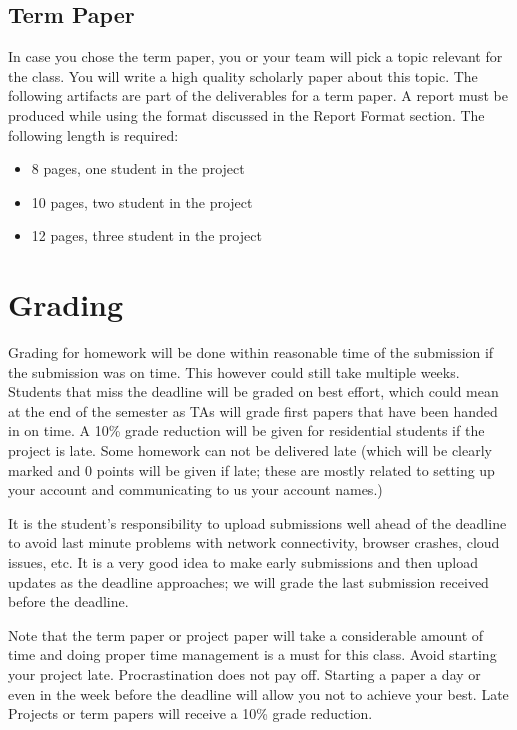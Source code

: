\subsection{Term Paper}

In case you chose the term paper, you or your team will pick a topic
relevant for the class. You will write a high quality scholarly paper
about this topic. The following artifacts are part of the deliverables
for a term paper. A report must be produced while using the format
discussed in the Report Format section. The following length is
required:

\begin{itemize}
\item 8 pages, one student in the project
\item 10 pages, two student in the project
\item 12 pages, three student in the project
\end{itemize}


\section{Grading}\label{grading}

Grading for homework will be done within reasonable time of the
submission if the submission was on time. This however could still
take multiple weeks. Students that miss the deadline will be graded on
best effort, which could mean at the end of the semester as TAs will
grade first papers that have been handed in on time.  A 10\% grade
reduction will be given for residential students if the project is
late.  Some homework can not be delivered late (which will be clearly
marked and 0 points will be given if late; these are mostly related to
setting up your account and communicating to us your account names.)

It is the student's responsibility to upload submissions well ahead of
the deadline to avoid last minute problems with network connectivity,
browser crashes, cloud issues, etc. It is a very good idea to make early
submissions and then upload updates as the deadline approaches; we will
grade the last submission received before the deadline.

Note that the term paper or project paper will take a considerable
amount of time and doing proper time management is a must for this
class. Avoid starting your project late. Procrastination does not pay
off. Starting a paper a day or even in the week before the deadline
will allow you not to achieve your best. Late Projects or term papers
will receive a 10\% grade reduction.

